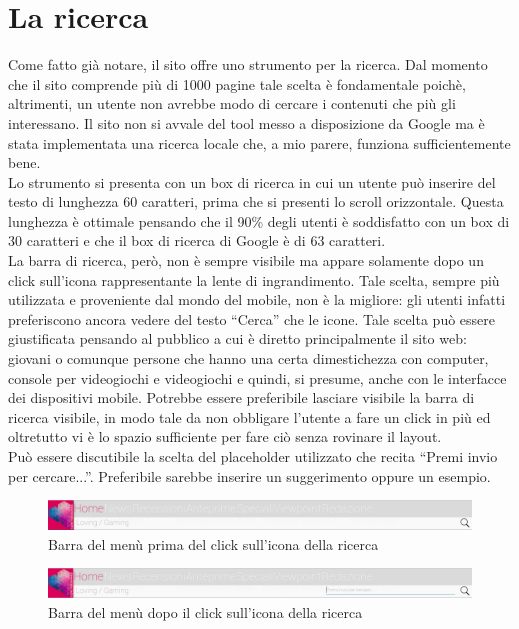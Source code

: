 \documentclass[../ProgettoTecWeb2.tex]{subfiles}
\begin{document}
\section{La ricerca}
	Come fatto già notare, il sito offre uno strumento per la ricerca. Dal momento che il sito comprende più di 1000 pagine tale scelta è fondamentale poichè, altrimenti, un utente non avrebbe modo di cercare i contenuti che più gli interessano. Il sito non si avvale del tool messo a disposizione da Google ma è stata implementata una ricerca locale che, a mio parere, funziona sufficientemente bene. \\
	Lo strumento si presenta con un box di ricerca in cui un utente può inserire del testo di lunghezza 60 caratteri, prima che si presenti lo scroll orizzontale. Questa lunghezza è ottimale pensando che il 90\% degli utenti è soddisfatto con un box di 30 caratteri e che il box di ricerca di Google è di 63 caratteri. \\
	La barra di ricerca, però, non è sempre visibile ma appare solamente dopo un click sull'icona rappresentante la lente di ingrandimento. Tale scelta, sempre più utilizzata e proveniente dal mondo del mobile, non è la migliore: gli utenti infatti preferiscono ancora vedere del testo ``Cerca'' che le icone. Tale scelta può essere giustificata pensando al pubblico a cui è diretto principalmente il sito web: giovani o comunque persone che hanno una certa dimestichezza con computer, console per videogiochi e videogiochi e quindi, si presume, anche con le interfacce dei dispositivi mobile. Potrebbe essere preferibile lasciare visibile la barra di ricerca visibile, in modo tale da non obbligare l'utente a fare un click in più ed oltretutto vi è lo spazio sufficiente per fare ciò senza rovinare il layout. \\
	Può essere discutibile la scelta del placeholder utilizzato che recita ``Premi invio per cercare...''. Preferibile sarebbe inserire un suggerimento oppure un esempio.
	\begin{figure} [H]
		\centering
		\includegraphics[scale=0.3]{img/BarraMenuILoveVg}
		\caption{Barra del menù prima del click sull'icona della ricerca}
	\end{figure}
	\begin{figure} [H]
		\centering
		\includegraphics[scale=0.3]{img/BarraMenuILoveVgDopoClick}
		\caption{Barra del menù dopo il click sull'icona della ricerca}
	\end{figure}
\end{document}
